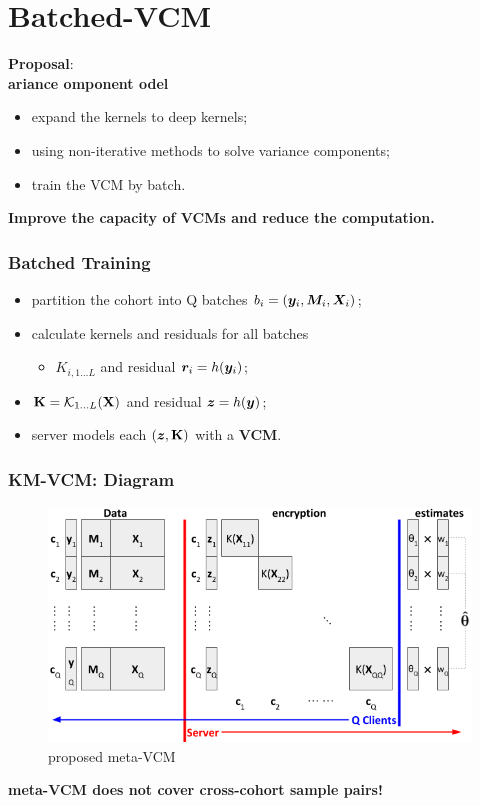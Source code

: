 \documentclass{beamer}
\begin{document}
\section{Batched-VCM}
\begin{frame}
  \large{\textbf{Proposal}}: \\
  \large{\textbf{ ariance omponent odel}}
  \begin{itemize}
  \item expand the kernels to deep kernels;
  \item using non-iterative methods to solve variance components;
  \item train the VCM by batch.
  \end{itemize}
  \textbf{Improve the capacity of VCMs and reduce the computation.}
\end{frame}
\begin{frame}\frametitle{Batched Training}
  \begin{itemize}
  \item partition the cohort into Q batches $b_i = ({\bm{y}}_i, {\bm{M}}_i, {\bm{X}}_i)$;
  \item calculate  kernels and residuals for all batches
    \begin{itemize}
    \item $K_{i, 1 \dots L}$ and residual ${\bm{r}}_i=h({\bm{y}}_i)$;
    \end{itemize}
  \item $\mathbf{K} = \mathcal{K}_{1 \dots L}(\mathbf{X})$ and residual ${\bm{z}}=h({\bm{y}})$;
  \item server models each $({\bm{z}}, \mathbf{K})$ with a \textbf{VCM}.
  \end{itemize}
\end{frame}
\begin{frame}\frametitle{KM-VCM: Diagram}
  \begin{figure}
    \centering \includegraphics[width=\textwidth]{img/meta1}
    \caption{proposed meta-VCM}
    \label{fig:mata1}
  \end{figure}
  \textbf{meta-VCM does not cover cross-cohort sample pairs!}
\end{frame}
\end{document}
